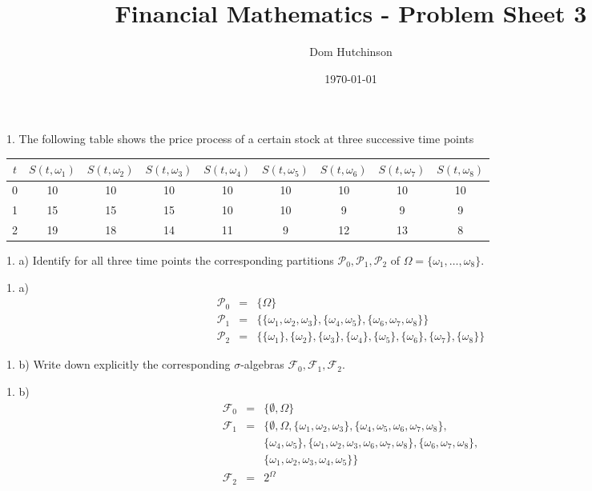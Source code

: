\documentclass[11pt,a4paper]{article}
\begin{document}

\title{Financial Mathematics - Problem Sheet 3}
\author{Dom Hutchinson}
\date{\today}
\maketitle


\begin{question}{1.}
  The following table shows the price process of a certain stock at three successive time points
  \begin{center}
    \begin{tabular}{c|cccccccc}
      $t$&$S(t,\omega_1)$&$S(t,\omega_2)$&$S(t,\omega_3)$&$S(t,\omega_4)$&$S(t,\omega_5)$&$S(t,\omega_6)$&$S(t,\omega_7)$&$S(t,\omega_8)$\\\hline
      0&10&10&10&10&10&10&10&10\\
      1&15&15&15&10&10&9&9&9\\
      2&19&18&14&11&9&12&13&8
    \end{tabular}
  \end{center}
\end{question}

\begin{question}{1. a)}
  Identify for all three time points the corresponding partitions $\mathcal{P}_0,\mathcal{P}_1,\mathcal{P}_2$ of $\Omega=\{\omega_1,\dots,\omega_8\}$.
\end{question}

\begin{answer}{1. a)}
  \[\begin{array}{rcl}
    \mathcal{P}_0&=&\big\{\Omega\big\}\\
    \mathcal{P}_1&=&\big\{\{\omega_1,\omega_2,\omega_3\},\{\omega_4,\omega_5\},\{\omega_6,\omega_7,\omega_8\}\big\}\\
    \mathcal{P}_2&=&\big\{\{\omega_1\},\{\omega_2\},\{\omega_3\},\{\omega_4\},\{\omega_5\},\{\omega_6\},\{\omega_7\},\{\omega_8\}\big\}
  \end{array}\]
\end{answer}

\begin{question}{1. b)}
  Write down explicitly the corresponding $\sigma$-algebras $\mathcal{F}_0,\mathcal{F}_1,\mathcal{F}_2$.
\end{question}

\begin{answer}{1. b)}
  \[\begin{array}{rcl}
    \mathcal{F}_0&=&\big\{\emptyset,\Omega\big\}\\
    \mathcal{F}_1&=&\big\{\emptyset,\Omega,\{\omega_1,\omega_2,\omega_3\},\{\omega_4,\omega_5,\omega_6,\omega_7,\omega_8\},\\
    &&\{\omega_4,\omega_5\},\{\omega_1,\omega_2,\omega_3,\omega_6,\omega_7,\omega_8\},\{\omega_6,\omega_7,\omega_8\},\\
    &&\{\omega_1,\omega_2,\omega_3,\omega_4,\omega_5\}\big\}\\
    \mathcal{F}_2&=&2^\Omega
  \end{array}\]
\end{answer}
\end{document}
